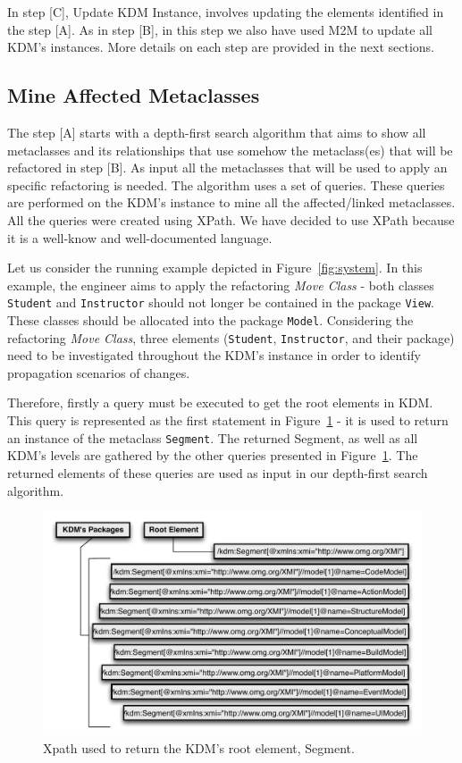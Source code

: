 In step [C], Update KDM Instance, involves updating the elements identified in the step [A].  As in step [B], in this step we also have used M2M to update all KDM's instances. 
More details on each step are provided in the next sections.

\subsection{Mine Affected Metaclasses} %
\label{sub:mine_affected_metaclasses}

The step [A] starts with a depth-first search algorithm that aims to show all metaclasses and its relationships that use somehow the metaclass(es) that will be refactored in step [B]. As input all the metaclasses that will be used to apply an specific refactoring is needed. The algorithm uses a set of queries. These queries are performed on the KDM's instance to mine all the affected/linked metaclasses. All the queries were created using XPath. We have decided to use XPath because it is a well-know and well-documented language. 

Let us consider the running example depicted in Figure~\ref{fig:system}. In this example, the engineer aims to apply the refactoring \textit{Move Class} - both classes \texttt{Student} and \texttt{Instructor} should not longer be contained in the package \texttt{View}. These classes should be allocated into the package \texttt{Model}. Considering the refactoring \textit{Move Class}, three elements (\texttt{Student}, \texttt{Instructor}, and their package) need to be investigated throughout the KDM's instance in order to identify propagation scenarios of changes. 

Therefore, firstly a query must be executed to get the root elements in KDM. This query is represented as the first statement in Figure~\ref{fig:queriesXPath} - it is used to return an instance of the metaclass \texttt{Segment}. The returned Segment, as well as all KDM's levels are gathered by the other queries presented in Figure~\ref{fig:queriesXPath}. The returned elements of these queries are used as input in our depth-first search algorithm.

\begin{figure}[h]
	\centering
	\includegraphics[scale=0.455]{figuras/XPathToReturnSegmentAndPackagesFormatted}
	\caption{Xpath used to return the KDM's root element, Segment.}
	\label{fig:queriesXPath}
\end{figure}



